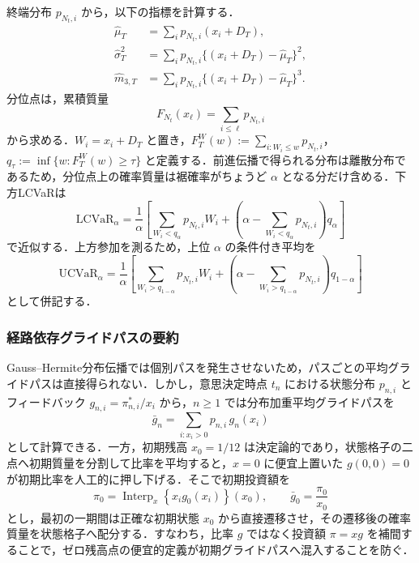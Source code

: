 \documentclass[10pt,a4paper]{article}
\theoremstyle{plain}
\theoremstyle{definition}
\DeclareMathOperator{\Interp}{Interp}
\begin{document}
終端分布 $p_{N_t,i}$ から，以下の指標を計算する．
\begin{align}
  \widehat{\mu}_T&=\sum_i p_{N_t,i}(x_i+D_T),\label{eq:mean-terminal}\\
  \widehat{\sigma}_T^2&=\sum_i p_{N_t,i}\{(x_i+D_T)-\widehat{\mu}_T\}^2,\label{eq:var-terminal}\\
  \widehat{m}_{3,T}&=\sum_i p_{N_t,i}\{(x_i+D_T)-\widehat{\mu}_T\}^3.\label{eq:third-terminal}
\end{align}
分位点は，累積質量
\begin{equation}
  F_{N_t}(x_\ell)=\sum_{i\leq \ell}p_{N_t,i}
  \label{eq:cdf-terminal}
\end{equation}
から求める．$W_i=x_i+D_T$ と置き，$F_T^W(w):=\sum_{i:W_i\leq w}p_{N_t,i}$，$q_\tau:=\inf\{w:F_T^W(w)\geq\tau\}$ と定義する．前進伝播で得られる分布は離散分布であるため，分位点上の確率質量は裾確率がちょうど $\alpha$ となる分だけ含める．下方LCVaRは
\begin{equation}
  \mathrm{LCVaR}_\alpha
  =\frac{1}{\alpha}
  \left[
    \sum_{W_i<q_\alpha}p_{N_t,i}W_i
    +\left(\alpha-\sum_{W_i<q_\alpha}p_{N_t,i}\right)q_\alpha
  \right]
  \label{eq:lcvar}
\end{equation}
で近似する．上方参加を測るため，上位 $\alpha$ の条件付き平均を
\begin{equation}
  \mathrm{UCVaR}_\alpha
  =\frac{1}{\alpha}
  \left[
    \sum_{W_i>q_{1-\alpha}}p_{N_t,i}W_i
    +\left(\alpha-\sum_{W_i>q_{1-\alpha}}p_{N_t,i}\right)q_{1-\alpha}
  \right]
  \label{eq:ucvar}
\end{equation}
として併記する．

\subsubsection{経路依存グライドパスの要約}

Gauss--Hermite分布伝播では個別パスを発生させないため，パスごとの平均グライドパスは直接得られない．しかし，意思決定時点 $t_n$ における状態分布 $p_{n,i}$ とフィードバック $g_{n,i}=\pi^*_{n,i}/x_i$ から，$n\geq1$ では分布加重平均グライドパスを
\begin{equation}
  \bar g_n=\sum_{i:x_i>0}p_{n,i}\,g_n(x_i)
  \label{eq:mean-glidepath}
\end{equation}
として計算できる．一方，初期残高 $x_0=1/12$ は決定論的であり，状態格子の二点へ初期質量を分割して比率を平均すると，$x=0$ に便宜上置いた $g(0,0)=0$ が初期比率を人工的に押し下げる．そこで初期投資額を
\begin{equation}
  \pi_0=\Interp_{x}\!\left\{x_i g_0(x_i)\right\}(x_0),
  \qquad
  \bar g_0=\frac{\pi_0}{x_0}
  \label{eq:exact-initial-glide}
\end{equation}
とし，最初の一期間は正確な初期状態 $x_0$ から直接遷移させ，その遷移後の確率質量を状態格子へ配分する．すなわち，比率 $g$ ではなく投資額 $\pi=xg$ を補間することで，ゼロ残高点の便宜的定義が初期グライドパスへ混入することを防ぐ．
\end{document}
